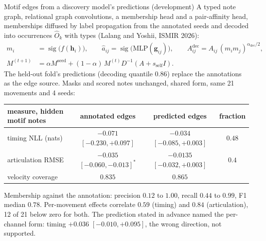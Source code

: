 \documentclass[aspectratio=169,11pt]{beamer}
\begin{document}
\begin{frame}{Motif edges from a discovery model's predictions (development)}
  \footnotesize
  A typed note graph, relational graph convolutions, a membership head
  and a pair-affinity head, memberships diffused by label propagation
  from the annotated seeds and decoded into occurrences $\hat O_k$ with
  types (Lalang and Yoshii, ISMIR 2026):
  \vspace{-1mm}
  \begin{align*}
    m_i &= \operatorname{sig}\bigl(f(\mathbf h_i)\bigr),\qquad
    \hat a_{ij} = \operatorname{sig}\bigl(\mathrm{MLP}(\mathbf g_{ij})\bigr),\qquad
    A^{\text{dec}}_{ij} = A_{ij}\,(m_i m_j)^{\alpha_{\text{dec}}/2},\\
    M^{(t+1)} &= \alpha M^{\text{seed}} + (1-\alpha)\, M^{(t)} D^{-1}(A + s_{\text{self}} I).
  \end{align*}
  The held-out fold's predictions (decoding quantile $0.86$) replace the
  annotations as the edge source. Masks and scored notes unchanged,
  shared form, same 21 movements and 4 seeds:
  \vspace{-1mm}
  \begin{center}
  \setlength{\tabcolsep}{5pt}
  \begin{tabular}{@{}lccc@{}}
    \toprule
    measure, hidden motif notes & annotated edges & predicted edges & fraction \\
    \midrule
    timing NLL (nats) & $-0.071$ $[-0.230,+0.097]$ & $-0.034$ $[-0.085,+0.003]$ & $0.48$ \\
    articulation RMSE & $-0.035$ $[-0.060,-0.013]^{*}$ & $-0.0135$ $[-0.032,+0.003]$ & $0.4$ \\
    velocity coverage & $0.835$ & $0.865$ & \\
    \bottomrule
  \end{tabular}
  \end{center}
  \vspace{-1mm}
  Membership against the annotation: precision $0.12$ to $1.00$, recall
  $0.44$ to $0.99$, F1 median $0.78$. Per-movement effects correlate
  $0.59$ (timing) and $0.84$ (articulation), 12 of 21 below zero for both.
  The prediction stated in advance named the per-channel form: timing
  $+0.036$ $[-0.010,+0.095]$, the wrong direction, not supported.
\end{frame}
\end{document}

